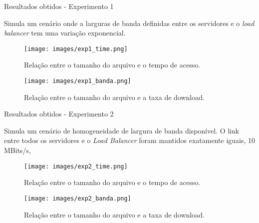 \documentclass{beamer}
\begin{document}
\begin{frame}{Resultados obtidos - Experimento 1}

    Simula um cenário onde a larguras de banda definidas entre os servidores e o \textit{load balancer} tem uma variação exponencial.

    \begin{figure}[ht]
        \begin{minipage}[b]{0.45\linewidth}
            \centering
            \texttt{[image: images/exp1\_time.png]}
            \caption{Relação entre o tamanho do arquivo e o tempo de acesso.}
            \label{fig:a}
        \end{minipage}
        \hspace{0.5cm}
        \begin{minipage}[b]{0.45\linewidth}
            \centering
            \texttt{[image: images/exp1\_banda.png]}
            \caption{Relação entre o tamanho do arquivo e a taxa de download.}
            \label{fig:b}
        \end{minipage}
    \end{figure}
\end{frame}  

\begin{frame}{Resultados obtidos - Experimento 2}

    Simula um cenário de homogeneidade de largura de banda disponível. O link entre todos os servidores e o \textit{Load Balancer} foram mantidos exatamente iguais, 10 MBits/s, 

    \begin{figure}[ht]
        \begin{minipage}[b]{0.45\linewidth}
            \centering
            \texttt{[image: images/exp2\_time.png]}
            \caption{Relação entre o tamanho do arquivo e o tempo de acesso.}
            \label{fig:a}
        \end{minipage}
        \hspace{0.5cm}
        \begin{minipage}[b]{0.45\linewidth}
            \centering
            \texttt{[image: images/exp2\_banda.png]}
            \caption{Relação entre o tamanho do arquivo e a taxa de download.}
            \label{fig:b}
        \end{minipage}
    \end{figure}
\end{frame}  
\end{document}

